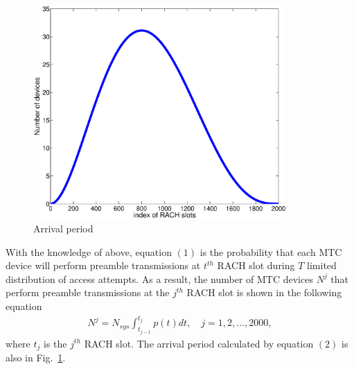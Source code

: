     \begin{figure}[t]
    \centering
    \includegraphics[width=3.8in]{fig_beta_distribution}
    \caption{Arrival period}
    \label{fig_beta_distribution}
    \end{figure}
     With the knowledge of above, equation $(1)$ is the probability that each MTC device will perform preamble transmissions at $t^{th}$ RACH slot during $T$ limited distribution of access attempts. As a result, the number of MTC devices $N^j$ that perform preamble transmissions at the $j^{th}$ RACH slot is shown in the following equation
    \begin{eqnarray}
      N^j=N_{sys}\int_{t_{j-1}}^{t_j}p(t)dt,\quad  j=1,2,...,2000,
    \end{eqnarray}
    where $t_j$ is the $j^{th}$ RACH slot. The arrival period calculated by equation $(2)$ is also in Fig.~\ref{fig_beta_distribution}.

